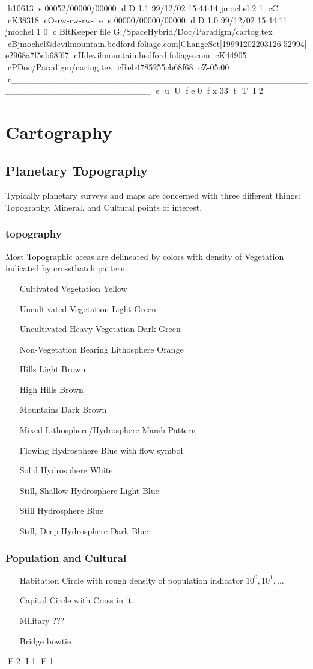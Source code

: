 h10613
s 00052/00000/00000
d D 1.1 99/12/02 15:44:14 jmochel 2 1
cC
cK38318
cO-rw-rw-rw-
e
s 00000/00000/00000
d D 1.0 99/12/02 15:44:11 jmochel 1 0
c BitKeeper file G:/SpaceHybrid/Doc/Paradigm/cartog.tex
cBjmochel@devilmountain.bedford.foliage.com|ChangeSet|19991202203126|52994|e2968a7f5cb68f67
cHdevilmountain.bedford.foliage.com
cK44905
cPDoc/Paradigm/cartog.tex
cReb4785255cb68f68
cZ-05:00
c______________________________________________________________________
e
u
U
f e 0
f x 33
t
T
I 2
\chapter{Cartography}

\section{Planetary Topography}

Typically planetary surveys and maps are concerned with three 
different things: Topography, Mineral, and Cultural points of interest.

\subsection{topography}
Most Topographic areas are delineated by colors with density of Vegetation 
indicated by crossthatch pattern.

\begin{itemize}
	\item[Cultivated Vegetation]
	Yellow
	\item[Uncultivated Vegetation]
	Light Green
	\item[Uncultivated Heavy Vegetation]
	Dark Green
	\item[Non-Vegetation Bearing Lithosphere]
	Orange
	\item[Hills]
	Light Brown
	\item[High Hills]
	Brown
	\item[Mountains]
	Dark Brown
	\item[Mixed Lithosphere/Hydrosphere]	
	Marsh Pattern
	\item[Flowing Hydrosphere]
	Blue with flow symbol
	\item[Solid Hydrosphere]
	White
	\item[Still, Shallow Hydrosphere]
	Light Blue
	\item[Still Hydrosphere]	
	Blue
	\item[Still, Deep Hydrosphere]
	Dark Blue
\end{itemize}

\subsection{Population and Cultural}

\begin{itemize}
	\item[Habitation]
	Circle with rough density of population indicator \( 10^0, 10^1, \dots \)
	\item[Capital]
	Circle with Cross in it.
	\item[Military]	
	???
	\item[Bridge]
	bowtie
\end{itemize}
E 2
I 1
E 1
